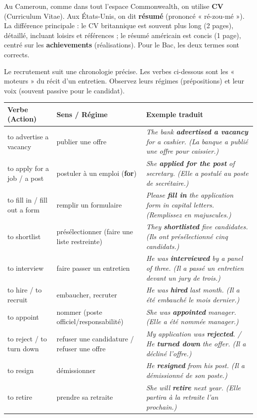 \documentclass[11pt]{article}
\newcommand{\cle}[1]{{\popxbold\color{popdark}#1}}
\newcounter{popsec}
\newcounter{popsub}
\newcommand{\courssub}[1]{%
  \stepcounter{popsub}%
  \par\vspace{9pt}\noindent{\popxbold\fontsize{11.5}{13}\selectfont\color{popink}{\color{poporange}\thepopsec.\thepopsub}\hspace{6pt}#1}\par\nopagebreak\vspace{4pt}
}
\newcommand{\eng}[1]{\ifmmode\text{\textit{#1}}\else\begingroup\selectlanguage{english}\itshape #1\endgroup\fi}
\begin{document}
\begin{savaistu}[CV ou Résumé ?]
Au Cameroun, comme dans tout l'espace Commonwealth, on utilise \textbf{CV} (Curriculum Vitae). Aux États-Unis, on dit \textbf{résumé} (prononcé « ré-zou-mé »). La différence principale : le CV britannique est souvent plus long (2 pages), détaillé, incluant loisirs et références ; le résumé américain est concis (1 page), centré sur les \textbf{achievements} (réalisations). Pour le Bac, les deux termes sont corrects.
\end{savaistu}

\courssub{Les actions clés du processus (Actions)}

Le recrutement suit une chronologie précise. Les verbes ci-dessous sont les « moteurs » du récit d'un entretien. Observez leurs régimes (prépositions) et leur voix (souvent passive pour le candidat).

\begin{center}
\begin{tabularx}{\linewidth}{|X|X|X|}
\hline
\rowcolor{popgreenL} \textbf{Verbe (Action)} & \textbf{Sens / Régime} & \textbf{Exemple traduit} \\
\hline
\cle{to advertise a vacancy} & publier une offre & \eng{The bank \textbf{advertised a vacancy} for a cashier.} (La banque a publié une offre pour caissier.) \\
\cle{to apply for a job / a post} & postuler à un emploi (\textbf{for}) & \eng{She \textbf{applied for the post} of secretary.} (Elle a postulé au poste de secrétaire.) \\
\cle{to fill in / fill out a form} & remplir un formulaire & \eng{Please \textbf{fill in} the application form in capital letters.} (Remplissez en majuscules.) \\
\cle{to shortlist} & présélectionner (faire une liste restreinte) & \eng{They \textbf{shortlisted} five candidates.} (Ils ont présélectionné cinq candidats.) \\
\cle{to interview} & faire passer un entretien & \eng{He was \textbf{interviewed} by a panel of three.} (Il a passé un entretien devant un jury de trois.) \\
\cle{to hire} / \cle{to recruit} & embaucher, recruter & \eng{He was \textbf{hired} last month.} (Il a été embauché le mois dernier.) \\
\cle{to appoint} & nommer (poste officiel/responsabilité) & \eng{She was \textbf{appointed} manager.} (Elle a été nommée manager.) \\
\cle{to reject} / \cle{to turn down} & refuser une candidature / refuser une offre & \eng{My application was \textbf{rejected}.} / \eng{He \textbf{turned down} the offer.} (Il a décliné l'offre.) \\
\cle{to resign} & démissionner & \eng{He \textbf{resigned} from his post.} (Il a démissionné de son poste.) \\
\cle{to retire} & prendre sa retraite & \eng{She will \textbf{retire} next year.} (Elle partira à la retraite l'an prochain.) \\
\hline
\end{tabularx}
\end{center}
\end{document}
